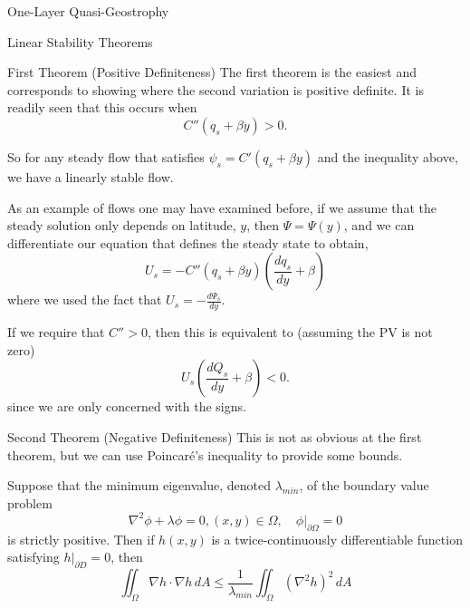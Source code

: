 \documentclass[12pt]{article}
\begin{document}
\begin{section}{One-Layer Quasi-Geostrophy}
\begin{subsection}{Linear Stability Theorems}
        \begin{subsubsection}{First Theorem (Positive Definiteness)}
            The first theorem is the easiest and corresponds to showing where the second variation is positive definite.  It is readily seen that this occurs when
            $$
            C''(q_s + \beta y) > 0.
            $$

            So for any steady flow that satisfies $\psi_s = C'(q_s + \beta y)$ and the inequality above, we have a linearly stable flow.

            As an example of flows one may have examined before, if we assume that the steady solution only depends on latitude, $y$, then $\Psi = \Psi(y)$, and we can differentiate our equation that defines the steady state to obtain,
            $$
            U_s = -C''(q_s + \beta y) \left(\frac{dq_s}{dy} + \beta \right)
            $$
            where we used the fact that $U_s = - \frac{d \Psi_s}{dy}$.

            If we require that $C'' > 0$, then this is equivalent to (assuming the PV is not zero)
            $$
            U_s \left(\frac{d Q_s}{dy} + \beta \right) < 0.
            $$
            since we are only concerned with the signs.
        \end{subsubsection}

        \begin{subsubsection}{Second Theorem (Negative Definiteness)}
            This is not as obvious at the first theorem, but we can use Poincar\'e's inequality to provide some bounds.

            Suppose that the minimum eigenvalue, denoted $\lambda_{min}$, of the boundary value problem
            $$
                \nabla^2 \phi + \lambda \phi = 0, (x,y) \in \Omega, \quad
                \left. \phi \right|_{\partial \Omega} = 0
            $$
            is strictly positive. Then if $h(x,y)$ is a twice-continuously differentiable function satisfying $\left. h\right|_{\partial D} = 0$, then
            $$
                \iint_\Omega\nabla h \cdot\nabla h \, dA \le \frac{1}{\lambda_{min}}\iint_\Omega (\nabla^2 h)^2 \, dA
            $$


\end{subsubsection}
\end{subsection}
\end{section}
\end{document}
